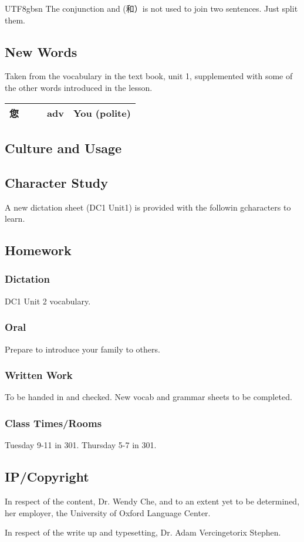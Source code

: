 \documentclass{article}
\newcommand{\myfont}{gbsn} %
\newcommand{\cvctp}[4]{#1 & \xpinyin*{#1} & \pinyin{#2} & #3 & #4 \\ \hline}
\begin{document}
\begin{CJK}{UTF8}{\myfont}
      The conjunction and (和）is not used to join two sentences.   Just split them.


\subsection{New Words}

Taken from the vocabulary in the text book, unit 1, supplemented with some of the other words introduced in the lesson.

    \begin{tabular}{|l|l|l|l|l|} \hline
      \cvctp{您}{nin}{adv}{You (polite)} 
    \end{tabular}

    \subsection{Culture and Usage}
\subsection{Character Study}

A new dictation sheet (DC1 Unit1) is provided with the followin gcharacters to learn.

\subsection{Homework}

\subsubsection{Dictation}

DC1 Unit 2 vocabulary.

\subsubsection{Oral}

Prepare to introduce your family to others.

\subsubsection{Written Work}

To be handed in and checked.  New vocab and grammar sheets to be completed.

\subsubsection{Class Times/Rooms}

Tuesday 9-11 in 301.  Thursday 5-7 in 301.

\subsection{IP/Copyright}

In respect of the content, Dr. Wendy Che, and to an extent yet to be determined, her employer, the University of Oxford Language Center.

In respect of the write up and typesetting, Dr. Adam Vercingetorix Stephen.

\end{CJK} 
\end{document}
